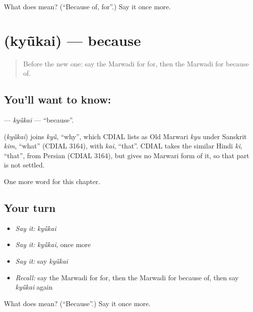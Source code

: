 \begin{tcolorbox}[breakable,colback=teal!4,colframe=teal!35!black,title={Before you move on}]
What does  mean? (\textquotedblleft{}Because of, for\textquotedblright{}.) Say it once more.
\end{tcolorbox}
\section[\texorpdfstring{\mw{क्यूंकै} (kyū̃kai)}{क्यूंकै (kyū̃kai)}]{ (kyū̃kai) — because}

\label{lesson:MW-C117-kyukai}



\begin{quote}
Before the new one: say the Marwadi for for, then the Marwadi for because of.
\end{quote}

\subsection*{You'll want to know: }
\textbf{} — \emph{kyū̃kai} — \textquotedblleft{}because\textquotedblright{}.

\begin{cousinweb}
\textbf{} (\emph{kyū̃kai}) joins \emph{kyū̃}, \textquotedblleft{}why\textquotedblright{}, which CDIAL lists as Old Marwari \emph{kyu} under Sanskrit \emph{kim}, \textquotedblleft{}what\textquotedblright{} (CDIAL 3164), with \emph{kai}, \textquotedblleft{}that\textquotedblright{}. CDIAL takes the similar Hindi \emph{ki}, \textquotedblleft{}that\textquotedblright{}, from Persian (CDIAL 3164), but gives no Marwari form of it, so that part is not settled.
\end{cousinweb}

\begin{grammarlens}[title={What you've built}]
One more word for this chapter.
\end{grammarlens}

\subsection*{Your turn}
\begin{itemize}
\raggedright
  \item \emph{Say it:} \emph{kyū̃kai}
  \item \emph{Say it:} \emph{kyū̃kai}, once more
  \item \emph{Say it:} say \emph{kyū̃kai}
  \item \emph{Recall:} say the Marwadi for for, then the Marwadi for because of, then say \emph{kyū̃kai} again
\end{itemize}

\begin{tcolorbox}[breakable,colback=teal!4,colframe=teal!35!black,title={Before you move on}]
What does  mean? (\textquotedblleft{}Because\textquotedblright{}.) Say it once more.
\end{tcolorbox}
